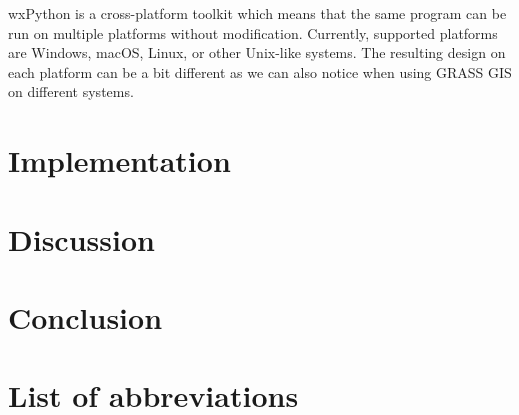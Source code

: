 \documentclass[a4paper,10pt,twoside]{article}
\begin{document}
wxPython is a cross-platform toolkit which means that the same program can be run on multiple platforms without modification. Currently, supported platforms are Windows, macOS, Linux, or other Unix-like systems. The resulting design on each platform can be a bit different as we can also notice when using GRASS GIS on different systems. 


\newpage
\vspace*{-1cm}
\section{Implementation}
\noindent
\large

\label{sec:2survey}

\newpage
\vspace*{-1cm}
\section*{Discussion}
\noindent
\large

\newpage
\vspace*{-1cm}
\section*{Conclusion}
\noindent
\large

\newpage
\vspace*{-1cm}
\section*{List of abbreviations}
\noindent
\large


\newpage
\vspace*{-6ex}
\renewcommand{\refname}{Bibliography} 
	
	
\end{document}
